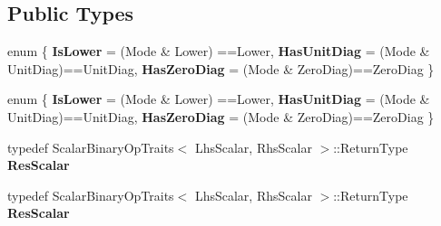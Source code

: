 \subsection*{Public Types}
\begin{DoxyCompactItemize}
\item 
\mbox{\label{structinternal_1_1packed__triangular__matrix__vector__product_3_01_index_00_01_mode_00_01_lhs_scbd6db00b6d9348a4e2779e2616adcdaa_a6767429efc0c7d98c1aad325e9ce289a}} 
enum \{ {\bfseries Is\+Lower} = (Mode \& Lower) ==Lower, 
{\bfseries Has\+Unit\+Diag} = (Mode \& Unit\+Diag)==Unit\+Diag, 
{\bfseries Has\+Zero\+Diag} = (Mode \& Zero\+Diag)==Zero\+Diag
 \}
\item 
\mbox{\label{structinternal_1_1packed__triangular__matrix__vector__product_3_01_index_00_01_mode_00_01_lhs_scbd6db00b6d9348a4e2779e2616adcdaa_ab394acea3b9a9ce0ef031ed15d3f215d}} 
enum \{ {\bfseries Is\+Lower} = (Mode \& Lower) ==Lower, 
{\bfseries Has\+Unit\+Diag} = (Mode \& Unit\+Diag)==Unit\+Diag, 
{\bfseries Has\+Zero\+Diag} = (Mode \& Zero\+Diag)==Zero\+Diag
 \}
\item 
\mbox{\label{structinternal_1_1packed__triangular__matrix__vector__product_3_01_index_00_01_mode_00_01_lhs_scbd6db00b6d9348a4e2779e2616adcdaa_aaa6dda6b5464bdfc3d9983a058a06895}} 
typedef Scalar\+Binary\+Op\+Traits$<$ Lhs\+Scalar, Rhs\+Scalar $>$\+::Return\+Type {\bfseries Res\+Scalar}
\item 
\mbox{\label{structinternal_1_1packed__triangular__matrix__vector__product_3_01_index_00_01_mode_00_01_lhs_scbd6db00b6d9348a4e2779e2616adcdaa_aaa6dda6b5464bdfc3d9983a058a06895}} 
typedef Scalar\+Binary\+Op\+Traits$<$ Lhs\+Scalar, Rhs\+Scalar $>$\+::Return\+Type {\bfseries Res\+Scalar}
\end{DoxyCompactItemize}
